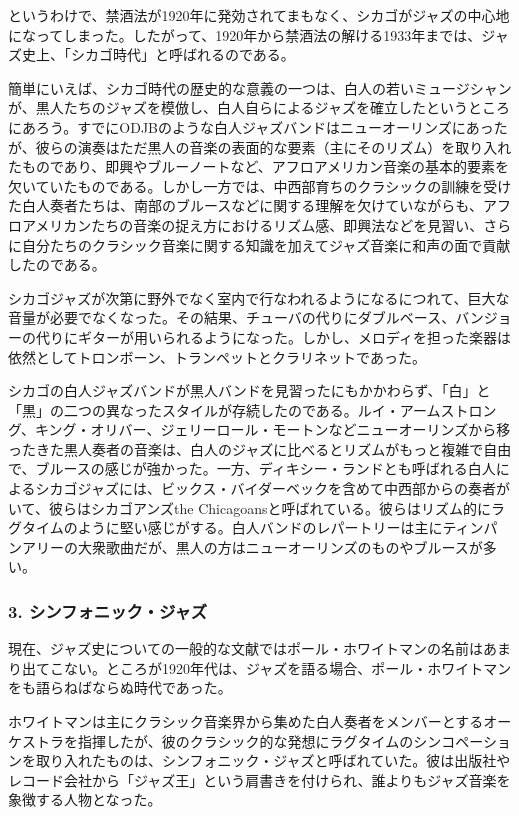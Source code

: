 というわけで、禁酒法が1920年に発効されてまもなく、シカゴがジャズの中心地になってしまった。したがって、1920年から禁酒法の解ける1933年までは、ジャズ史上、「シカゴ時代」と呼ばれるのである。

簡単にいえば、シカゴ時代の歴史的な意義の一つは、白人の若いミュージシャンが、黒人たちのジャズを模倣し、白人自らによるジャズを確立したというところにあろう。すでにODJBのような白人ジャズバンドはニューオーリンズにあったが、彼らの演奏はただ黒人の音楽の表面的な要素（主にそのリズム）を取り入れたものであり、即興やブルーノートなど、アフロアメリカン音楽の基本的要素を欠いていたものである。しかし一方では、中西部育ちのクラシックの訓練を受けた白人奏者たちは、南部のブルースなどに関する理解を欠けていながらも、アフロアメリカンたちの音楽の捉え方におけるリズム感、即興法などを見習い、さらに自分たちのクラシック音楽に関する知識を加えてジャズ音楽に和声の面で貢献したのである。

シカゴジャズが次第に野外でなく室内で行なわれるようになるにつれて、巨大な音量が必要でなくなった。その結果、チューバの代りにダブルベース、バンジョーの代りにギターが用いられるようになった。しかし、メロディを担った楽器は依然としてトロンボーン、トランペットとクラリネットであった。

シカゴの白人ジャズバンドが黒人バンドを見習ったにもかかわらず、「白」と「黒」の二つの異なったスタイルが存続したのである。ルイ・アームストロング、キング・オリバー、ジェリーロール・モートンなどニューオーリンズから移ったきた黒人奏者の音楽は、白人のジャズに比べるとリズムがもっと複雑で自由で、ブルースの感じが強かった。一方、ディキシー・ランドとも呼ばれる白人によるシカゴジャズには、ビックス・バイダーベックを含めて中西部からの奏者がいて、彼らはシカゴアンズthe Chicagoansと呼ばれている。彼らはリズム的にラグタイムのように堅い感じがする。白人バンドのレパートリーは主にティンパンアリーの大衆歌曲だが、黒人の方はニューオーリンズのものやブルースが多い。

\subsubsection{3. シンフォニック・ジャズ}

現在、ジャズ史についての一般的な文献ではポール・ホワイトマンの名前はあまり出てこない。ところが1920年代は、ジャズを語る場合、ポール・ホワイトマンをも語らねばならぬ時代であった。

ホワイトマンは主にクラシック音楽界から集めた白人奏者をメンバーとするオーケストラを指揮したが、彼のクラシック的な発想にラグタイムのシンコペーションを取り入れたものは、シンフォニック・ジャズと呼ばれていた。彼は出版社やレコード会社から「ジャズ王」という肩書きを付けられ、誰よりもジャズ音楽を象徴する人物となった。

